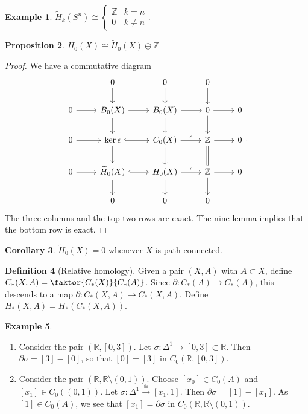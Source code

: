\documentclass[10pt,letterpaper,cm]{nupset}
\theoremstyle{definition}
\newtheorem{definition}{Definition}[subsection]
\newtheorem{exmp}[definition]{Example}
\theoremstyle{theorem}
\newtheorem{prop}[definition]{Proposition}
\newtheorem{corollary}[definition]{Corollary}
\theoremstyle{remark}
\newcommand{\R}{\mathbb{R}}
\newcommand{\Z}{\mathbb Z}
\newcommand{\1}{\mathbb{1}}
\newcommand{\0}{\vec 0}
\begin{document}
\begin{exmp}
$\widetilde{H}_k(S^n) \cong \begin{cases} \Z & k = n \\  0& k \ne n \end{cases}.$
\end{exmp}

\begin{prop}
$H_0(X) \cong \widetilde{H}_0(X) \oplus \Z$
\end{prop}
\begin{proof}
We have a commutative diagram
\[
\begin{tikzcd}
            & 0 \arrow[d]                                  & 0 \arrow[d]                            & 0 \arrow[d]            &   \\
0 \arrow[r] & B_0(X) \arrow[d] \arrow[r]                   & B_0(X) \arrow[d] \arrow[r]             & 0 \arrow[d] \arrow[r]  & 0 \\
0 \arrow[r] & \ker{\epsilon} \arrow[d] \arrow[r, hook]     & C_0(X) \arrow[d] \arrow[r, "\epsilon"] & \Z \arrow[d, equal] \arrow[r] & 0 \\
0 \arrow[r] & \widetilde{H}_0(X) \arrow[d] \arrow[r, hook] & H_0(X) \arrow[d] \arrow[r, "\epsilon"] & \Z \arrow[d] \arrow[r] & 0 \\
            & 0                                            & 0                                      & 0                      &  
\end{tikzcd}
.\] The three columns and the top two rows are exact. The nine lemma implies that the bottom row is exact.
\end{proof}

\begin{corollary}\label{c10}
$\widetilde{H}_0(X)=0$ whenever $X$ is path connected. 
\end{corollary}

\begin{definition}[Relative homology]
Given a pair $(X,A)$ with $A\subset X$, define $C_{\ast}(X,A) = \faktor{C_{\ast}(X)}{C_{\ast}(A)}$. Since $\partial : C_{\ast}(A) \to C_{\ast}(A)$, this descends to a map $\partial : C_{\ast}(X,A) \to C_{\ast}(X,A)$. Define $ H_{\ast}(X,A) = H_{\ast}(C_{\ast}(X,A))   .$
\end{definition}

\begin{exmp} $ $
\begin{enumerate}
\item Consider the pair $(\R, [0,3])$. Let $\sigma : \Delta^1 \to [0,3]\subset \R$. Then $\partial{\sigma} = [3] -[0]$, so that $[0] = [3]$ in $C_0(\R, [0,3])$.
\item Consider the pair $(\R, \R \setminus (0,1))$. Choose $[x_0] \in C_0(A)$ and $[x_1] \in C_0((0,1))$. Let $\sigma : \Delta^1 \overset{\cong}{\longrightarrow} [x_1, 1]$. Then $\partial{\sigma} = [1] -[x_1]$. As $[1]\in C_0(A)$, we see that $[x_1] = \partial{\sigma}$ in $C_0(\R, \R\setminus (0,1))$.
\end{enumerate}
\end{exmp}
\end{document}
